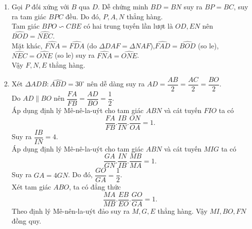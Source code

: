 \begin{ex}
{\begin{enumerate}
Tứ giác $ADBN$ có $\widehat{ADB}+\widehat{ANB}=180^\circ$, $D, N$ là hai đỉnh đối nhau nên tứ giác $ADBN$ nội tiếp.
        \item Gọi $P$ đối xứng với $B$ qua $D$. Dễ chứng minh $BD = BN$ suy ra $BP =BC$, suy ra tam giác $BPC$ đều. Do đó, $P, A, N$ thẳng hàng. \\
Tam giác $BPO \backsim CBE$ có hai trung tuyến lần lượt là $OD, EN$ nên $\widehat{BOD}=\widehat{NEC}$.\\
Mặt khác, $\widehat{FNA}=\widehat{FDA}$ (do $\Delta DAF=\Delta NAF$),$\widehat{FAD}=\widehat{BOD}$ (so le), $\widehat{NEC}=\widehat{ONE}$ (so le) suy ra $\widehat{FNA}=\widehat{ONE}$. \\
Vậy $F, N, E$ thẳng hàng.

\item Xét $\Delta ADB: \widehat{ABD}=30^\circ$ nên dễ dàng suy ra $AD=\dfrac{AB}{2}=\dfrac{AC}{2}=\dfrac{BO}{2}$.\\
Do $AD \parallel BO$ nên $\dfrac{FA}{FB}=\dfrac{AD}{BO}=\dfrac{1}{2}$.\\
Áp dụng định lý Mê-nê-la-uýt cho tam giác $ABN$ và cát tuyến $FIO$ ta có
\[ \dfrac{FA}{FB}.\dfrac{IB}{IN}.\dfrac{ON}{OA}=1.\]
Suy ra $\dfrac{IB}{IN}=4$.\\
Áp dụng định lý Mê-nê-la-uýt cho tam giác $ABN$ và cát tuyến $MIG$ ta có
\[ \dfrac{GA}{GN}.\dfrac{IN}{IB}.\dfrac{MB}{MA}=1.\]
Suy ra $GA=4GN$. Do đó, $\dfrac{GO}{GA}=\dfrac{1}{2}$.\\
Xét tam giác $ABO$, ta có đẳng thức
\[\dfrac{MA}{MB}.\dfrac{EB}{EO}.\dfrac{GO}{GA}=1.\]
Theo định lý Mê-nên-la-uýt đảo suy ra $M, G, E$ thẳng hàng. Vậy $MI, BO, FN$ đồng quy.
    \end{enumerate}
    }
\end{ex}

